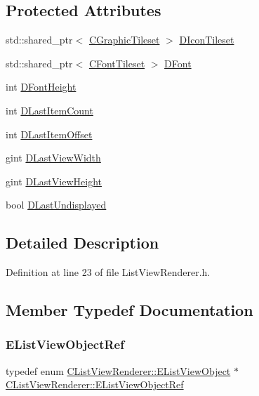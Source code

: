 \subsection*{Protected Attributes}
\begin{DoxyCompactItemize}
\item 
std\+::shared\+\_\+ptr$<$ \hyperlink{classCGraphicTileset}{C\+Graphic\+Tileset} $>$ \hyperlink{classCListViewRenderer_af6e36f127e551dd54c01f8df0fadeb9c}{D\+Icon\+Tileset}
\item 
std\+::shared\+\_\+ptr$<$ \hyperlink{classCFontTileset}{C\+Font\+Tileset} $>$ \hyperlink{classCListViewRenderer_a1fc512e6dd37dba02b6e6fa5800ef222}{D\+Font}
\item 
int \hyperlink{classCListViewRenderer_a4d5e792e525ca2df01f0300bfe1248af}{D\+Font\+Height}
\item 
int \hyperlink{classCListViewRenderer_a087155c29c7ac3a830f6645af590ed94}{D\+Last\+Item\+Count}
\item 
int \hyperlink{classCListViewRenderer_ad6b2b0052b8f74e3198fbfb39900b4e3}{D\+Last\+Item\+Offset}
\item 
gint \hyperlink{classCListViewRenderer_ad88d5d0b8209dd9ae1cf726f99339640}{D\+Last\+View\+Width}
\item 
gint \hyperlink{classCListViewRenderer_a7f74a3883638efee557cde501d47ee70}{D\+Last\+View\+Height}
\item 
bool \hyperlink{classCListViewRenderer_ad08a63dfe697395050c5af2ce4479aa2}{D\+Last\+Undisplayed}
\end{DoxyCompactItemize}


\subsection{Detailed Description}


Definition at line 23 of file List\+View\+Renderer.\+h.



\subsection{Member Typedef Documentation}
\hypertarget{classCListViewRenderer_a480fc50c1a5f78ff25b83a8c7973ebd3}{}\label{classCListViewRenderer_a480fc50c1a5f78ff25b83a8c7973ebd3} 
\subsubsection{\texorpdfstring{E\+List\+View\+Object\+Ref}{EListViewObjectRef}}
{\footnotesize\ttfamily typedef  enum \hyperlink{classCListViewRenderer_a120f3c9b0b96dd6e9bce814a52aafb93}{C\+List\+View\+Renderer\+::\+E\+List\+View\+Object} $\ast$ \hyperlink{classCListViewRenderer_a480fc50c1a5f78ff25b83a8c7973ebd3}{C\+List\+View\+Renderer\+::\+E\+List\+View\+Object\+Ref}}



